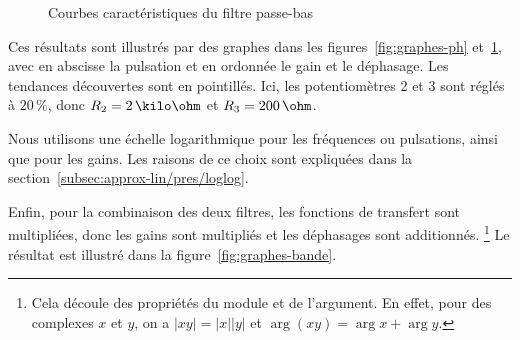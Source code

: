 \begin{figure}[h!]
    \centering
    \qquad
    \caption{Courbes caractéristiques du filtre passe-bas}
    \label{fig:graphes-pb}
\end{figure}

Ces résultats sont illustrés par des graphes dans
les figures~\ref{fig:graphes-ph} et~\ref{fig:graphes-pb},
avec en abscisse la pulsation
et en ordonnée le gain et le déphasage.
Les tendances découvertes sont en pointillés.
Ici, les potentiomètres 2 et 3 sont réglés à $20\,\%$,
donc $R_2 = 2\,\kilo\ohm$ et $R_3 = 200\,\ohm$.

Nous utilisons une échelle logarithmique pour les fréquences
ou pulsations, ainsi que pour les gains.
Les raisons de ce choix sont expliquées dans
la section~\ref{subsec:approx-lin/pres/loglog}.

Enfin, pour la combinaison des deux filtres,
les fonctions de transfert sont multipliées,
donc les gains sont multipliés et les déphasages sont additionnés.%
\footnote{
    Cela découle des propriétés du module et de l'argument.
    En effet, pour des complexes $x$ et $y$,
    on a $|xy| = |x||y|$ et $\arg(xy) = \arg x + \arg y$.
}
Le résultat est illustré dans la figure~\ref{fig:graphes-bande}.

